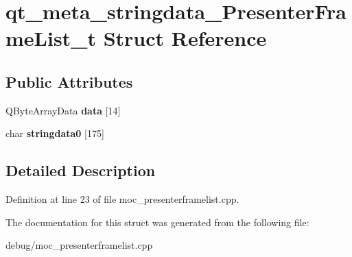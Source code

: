 \hypertarget{structqt__meta__stringdata___presenter_frame_list__t}{}\section{qt\+\_\+meta\+\_\+stringdata\+\_\+\+Presenter\+Frame\+List\+\_\+t Struct Reference}
\label{structqt__meta__stringdata___presenter_frame_list__t}
\subsection*{Public Attributes}
\begin{DoxyCompactItemize}
\item 
\mbox{\label{structqt__meta__stringdata___presenter_frame_list__t_a2be995191a531863c42fe7befc8b8110}} 
Q\+Byte\+Array\+Data {\bfseries data} \mbox{[}14\mbox{]}
\item 
\mbox{\label{structqt__meta__stringdata___presenter_frame_list__t_a4c920b76fca319001c432bd90660044c}} 
char {\bfseries stringdata0} \mbox{[}175\mbox{]}
\end{DoxyCompactItemize}


\subsection{Detailed Description}


Definition at line 23 of file moc\+\_\+presenterframelist.\+cpp.



The documentation for this struct was generated from the following file\+:\begin{DoxyCompactItemize}
\item 
debug/moc\+\_\+presenterframelist.\+cpp\end{DoxyCompactItemize}
